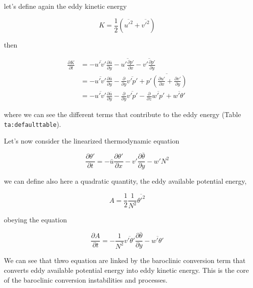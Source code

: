 let's define again the eddy kinetic energy

\[K = \frac{1}{2}\left(\overline{u'^2} + \overline{v'^2}\right)\]

then

\[
\begin{aligned}
\frac{\partial K}{\partial t} &= -\overline{u'v'}\frac{\partial \bar{u}}{\partial y} -\overline{u'\frac{\partial p'}{\partial x}} -\overline{v'\frac{\partial p'}{\partial y}}\\
&= -\overline{u'v'}\frac{\partial \bar{u}}{\partial y}-\frac{\partial }{\partial y}\overline{v'p'} +\overline{p'\left(\frac{\partial u'}{\partial x}+\frac{\partial v'}{\partial y}\right)}\\
&= -\overline{u'v'}\frac{\partial \bar{u}}{\partial y}-\frac{\partial }{\partial y}\overline{v'p'} -\frac{\partial }{\partial z}\overline{w' p'} +\overline{w'\theta'}
\end{aligned}
\]

where we can see the different terms that contribute to the eddy energy
(Table \texttt{ta:defaulttable}).

Let's now consider the linearized thermodynamic equation

\[\frac{\partial \theta'}{\partial t} = -\bar{u}\frac{\partial \theta'}{\partial x} -v'\frac{\partial \bar{\theta}}{\partial y} -w'N^2\]

we can define also here a quadratic quantity, the eddy available
potential energy,

\[A = \frac{1}{2}\frac{1}{N^2}\overline{\theta'^2}\]

obeying the equation

\[\frac{\partial A}{\partial t} = -\frac{1}{N^2}\overline{v'\theta'}\frac{\partial \bar{\theta}}{\partial y} - \overline{w'\theta'}\]

We can see that thwo equation are linked by the baroclinic conversion
term that converts eddy available potential energy into eddy kinetic
energy. This is the core of the baroclinic conversion instabilities and
processes.



